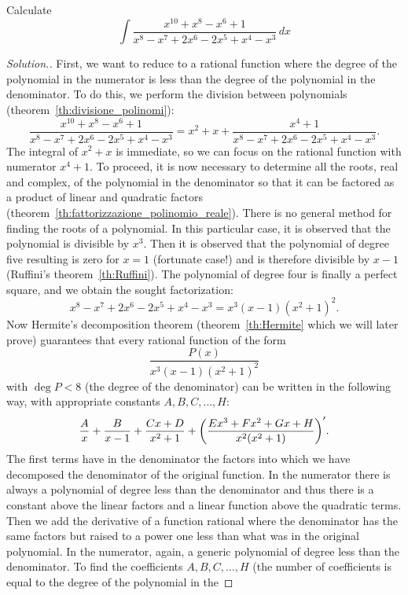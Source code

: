 \begin{example}
  Calculate
  \[
   \int \frac{x^{10}+x^8-x^6+1}{x^8-x^7+2x^6-2x^5+x^4-x^3}\, dx
  \]
\end{example}
\begin{proof}[Solution.]
First, we want to reduce to a rational function
where the degree of the polynomial in the numerator is less
than the degree of the polynomial in the denominator. To do this, we perform
the division between polynomials
(theorem~\ref{th:divisione_polinomi}):
\[
  \frac{x^{10}+x^8-x^6+1}{x^8-x^7+2x^6-2x^5+x^4-x^3}
  = x^2 + x + \frac{x^4+1}{x^8-x^7+2x^6-2x^5+x^4-x^3}.
\]
The integral of $x^2+x$ is immediate, so we can focus
on the rational function with numerator $x^4+1$.
To proceed, it is now necessary to determine all the roots, real and complex, of
the polynomial in the denominator so that it can be factored
as a product of linear and quadratic factors
(theorem~\ref{th:fattorizzazione_polinomio_reale}).
There is no general method for finding the roots of a polynomial.
In this particular case, it is observed
that the polynomial is divisible by $x^3$. Then it is observed that the
polynomial
of degree five resulting is zero for $x=1$ (fortunate case!) and
is therefore divisible by $x-1$ (Ruffini's theorem~\ref{th:Ruffini}).
The polynomial of degree four
is finally a perfect square, and we obtain the sought factorization:
\[
x^8-x^7+2x^6-2x^5+x^4-x^3 = x^3(x-1)(x^2+1)^2.
\]
Now Hermite's decomposition theorem (theorem~\ref{th:Hermite} which we will
later prove)
guarantees that every rational function of the form
\[
\frac{P(x)}{x^3(x-1)(x^2+1)^2}
\]
with $\deg P < 8$ (the degree of the denominator) can be
written in the following way, with
appropriate constants $A,B,C,\dots,H$:
\begin{equation}\label{eq:438943}
  \frac{A}{x} + \frac{B}{x-1} + \frac{Cx+D}{x^2+1}
  + {\left( \frac{Ex^3 + Fx^2 + G x + H}{x^2(x^2+1)} \right)}'.
\end{equation}
The first terms have in the denominator the factors into which we have
decomposed the denominator of the original function. In the numerator
there is always a polynomial of degree less than the denominator
and thus there is a constant above the linear factors and a linear function
above the quadratic terms. Then we add the derivative of a function
rational where the denominator has the same factors but raised to a
power one less than what was in the original polynomial.
In the numerator, again, a generic polynomial of degree less than the
denominator.
To find the coefficients $A,B,C, \dots, H$ 
(the number of coefficients is equal to the degree of the polynomial in the

\end{proof}
